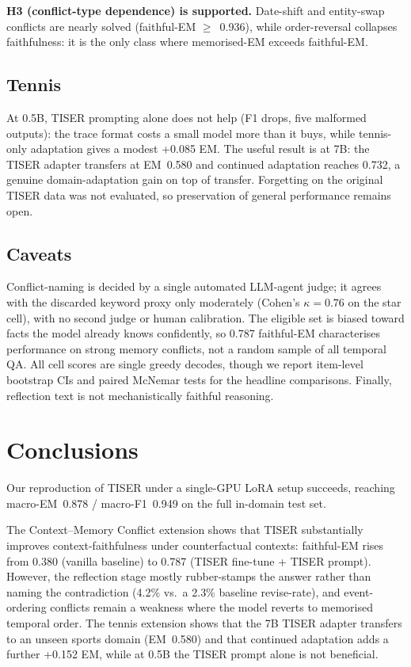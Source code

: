 \documentclass[conference]{IEEEtran}
\begin{document}
\textbf{H3 (conflict-type dependence) is supported.} Date-shift and entity-swap conflicts are nearly solved (faithful-EM $\geq$~0.936), while order-reversal collapses faithfulness: it is the only class where memorised-EM exceeds faithful-EM.

\subsection{Tennis}

At 0.5B, TISER prompting alone does not help (F1 drops, five malformed outputs): the trace format costs a small model more than it buys, while tennis-only adaptation gives a modest +0.085 EM. The useful result is at 7B: the TISER adapter transfers at EM~0.580 and continued adaptation reaches 0.732, a genuine domain-adaptation gain on top of transfer. Forgetting on the original TISER data was not evaluated, so preservation of general performance remains open.

\subsection{Caveats}

Conflict-naming is decided by a single automated LLM-agent judge; it agrees with the discarded keyword proxy only moderately (Cohen's $\kappa{=}0.76$ on the star cell), with no second judge or human calibration. The eligible set is biased toward facts the model already knows confidently, so 0.787 faithful-EM characterises performance on strong memory conflicts, not a random sample of all temporal QA. All cell scores are single greedy decodes, though we report item-level bootstrap CIs and paired McNemar tests for the headline comparisons. Finally, reflection text is not mechanistically faithful reasoning.

\section{Conclusions}

Our reproduction of TISER under a single-GPU LoRA setup succeeds, reaching macro-EM~0.878 / macro-F1~0.949 on the full in-domain test set.

The Context--Memory Conflict extension shows that TISER substantially improves context-faithfulness under counterfactual contexts: faithful-EM rises from 0.380 (vanilla baseline) to 0.787 (TISER fine-tune + TISER prompt). However, the reflection stage mostly rubber-stamps the answer rather than naming the contradiction (4.2\% vs.\ a 2.3\% baseline revise-rate), and event-ordering conflicts remain a weakness where the model reverts to memorised temporal order. The tennis extension shows that the 7B TISER adapter transfers to an unseen sports domain (EM~0.580) and that continued adaptation adds a further +0.152 EM, while at 0.5B the TISER prompt alone is not beneficial.
\end{document}
